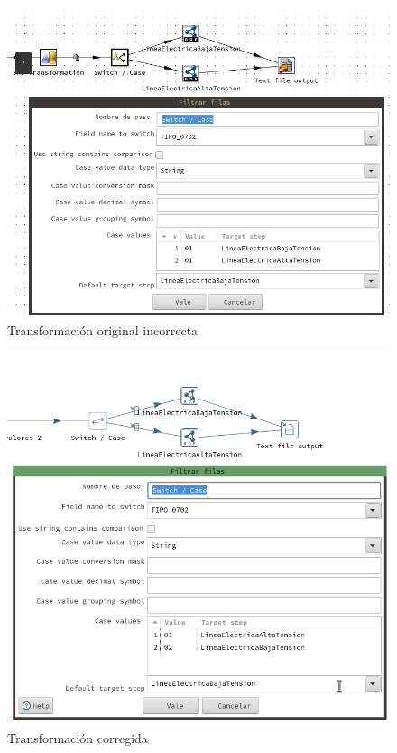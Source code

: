 \begin{figure}[H]
    \includegraphics[width=\textwidth]{images/linea-electrica-orig.png}
    \centering
    \caption{Transformación original incorrecta}
    \label{fig:linea-electrica-orig}
\end{figure}

\begin{figure}[H]
    \includegraphics[width=\textwidth]{images/linea-electrica-new.png}
    \centering
    \caption{Transformación corregida}
    \label{fig:linea-electrica-new}
\end{figure}

